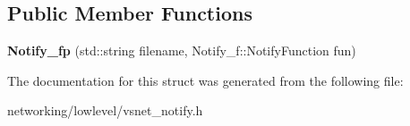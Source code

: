 \subsection*{Public Member Functions}
\begin{DoxyCompactItemize}
\item 
{\bfseries Notify\+\_\+fp} (std\+::string filename, Notify\+\_\+f\+::\+Notify\+Function fun)\hypertarget{structVsnetDownload_1_1Client_1_1Notify__fp_a036d5de7e9fae66f4aad869e2071fc8c}{}\label{structVsnetDownload_1_1Client_1_1Notify__fp_a036d5de7e9fae66f4aad869e2071fc8c}

\end{DoxyCompactItemize}


The documentation for this struct was generated from the following file\+:\begin{DoxyCompactItemize}
\item 
networking/lowlevel/vsnet\+\_\+notify.\+h\end{DoxyCompactItemize}
